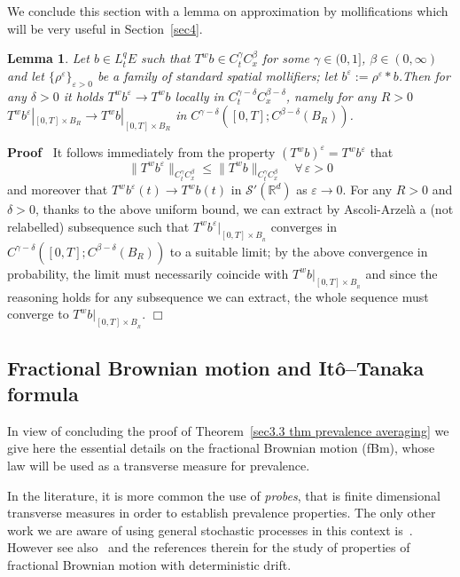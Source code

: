 \documentclass[10pt]{article}
\newcommand{\assign}{:=}
\newcommand{\nobracket}{}
\newcommand{\tmtextit}[1]{{\itshape{#1}}}
\newenvironment{proof}{\noindent\textbf{Proof\ }}{\hspace*{\fill}$\Box$\medskip}
\newtheorem{lemma}{Lemma}
\begin{document}
We conclude this section with a lemma on approximation by mollifications which will
be very useful in Section~\ref{sec4}.

\begin{lemma}
  \label{sec3.1 lemma 3}Let $b \in L^q_t E$ such that $T^w b \in C^{\gamma}_t
  C^{\beta}_x$ for some $\gamma \in (0, 1]$, $\beta \in (0, \infty)$ and let
  $\{ \rho^{\varepsilon} \}_{\varepsilon > 0}$ be a family of standard spatial
  mollifiers; let $b^{\varepsilon} \assign \rho^{\varepsilon} \ast b$.Then for
  any $\delta > 0$ it holds $T^w b^{\varepsilon} \rightarrow T^w b$ locally in
  $C^{\gamma - \delta}_t C^{\beta - \delta}_x$, namely for any $R > 0$ $T^w
  b^{\varepsilon} |_{[0, T] \times B_R} \nobracket \rightarrow T^w b |_{[0, T]
  \times B_R} \nobracket$ in $C^{\gamma - \delta} ([0, T] ; C^{\beta - \delta}
  (B_R))$.
\end{lemma}

\begin{proof}
  It follows immediately from the property $(T^w b)^{\varepsilon} = T^w
  b^{\varepsilon}$ that
  \[ \| T^w b^{\varepsilon} \|_{C^{\gamma}_t C^{\beta}_x} \leqslant \| T^w
     b \|_{C^{\gamma}_t C^{\beta}_x} \quad \forall \,
     \varepsilon > 0 \]
  and moreover that $T^w b^{\varepsilon} (t) \rightarrow T^w b (t)$ in
  $\mathcal{S}' (\mathbb{R}^d)$ as $\varepsilon \rightarrow 0$. For any $R >
  0$ and $\delta > 0$, thanks to the above uniform bound, we can extract by
  Ascoli-Arzel{\`a} a (not relabelled) subsequence such that $T^w
  b^{\varepsilon} |_{[0, T] \times B_{_R}}$ converges in
  $C^{\gamma - \delta} ([0, T] ; C^{\beta - \delta} (B_R))$ to a suitable
  limit; by the above convergence in probability, the limit must necessarily
  coincide with $T^w b |_{[0, T] \times B_{_R}}$ and since the
  reasoning holds for any subsequence we can extract, the whole sequence must
  converge to $T^w b |_{[0, T] \times B_{_R}}$.
\end{proof}

\subsection{Fractional Brownian motion and It\^{o}--Tanaka
formula}\label{sec2.2}

In view of concluding the proof of Theorem~\ref{sec3.3 thm prevalence
averaging} we give here the essential details on the fractional Brownian
motion (fBm), whose law will be used as a transverse measure for prevalence.

In the literature, it is more common the use of \tmtextit{probes}, that is
finite dimensional transverse measures in order to establish prevalence
properties. The only other work we are aware of using general stochastic
processes in this context is~{\cite{bayart}}. However see also~{\cite{peres}}
and the references therein for the study of properties of fractional Brownian
motion with deterministic drift.
\end{document}
